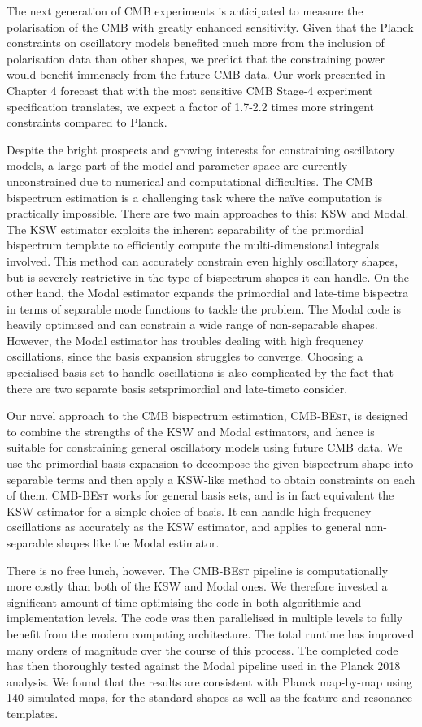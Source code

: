 The next generation of CMB experiments is anticipated to measure the polarisation of the CMB with greatly enhanced sensitivity. Given that the Planck constraints on oscillatory models benefited much more from the inclusion of polarisation data than other shapes, we predict that the constraining power would benefit immensely from the future CMB data. Our work presented in Chapter 4 forecast that with the most sensitive CMB Stage-4 experiment specification translates, we expect a factor of 1.7-2.2 times more stringent constraints compared to Planck.

Despite the bright prospects and growing interests for constraining oscillatory models, a large part of the model and parameter space are currently unconstrained due to numerical and computational difficulties. The CMB bispectrum estimation is a challenging task where the na\"ive computation is practically impossible. There are two main approaches to this: KSW and Modal. The KSW estimator exploits the inherent separability of the primordial bispectrum template to efficiently compute the multi-dimensional integrals involved. This method can accurately constrain even highly oscillatory shapes, but is severely restrictive in the type of bispectrum shapes it can handle. On the other hand, the Modal estimator expands the primordial and late-time bispectra in terms of separable mode functions to tackle the problem. The Modal code is heavily optimised and can constrain a wide range of non-separable shapes. However, the Modal estimator has troubles dealing with high frequency oscillations, since the basis expansion struggles to converge. Choosing a specialised basis set to handle oscillations is also complicated by the fact that there are two separate basis sets\textemdash primordial and late-time\textemdash to consider.

Our novel approach to the CMB bispectrum estimation, \textsc{CMB-BEst}, is designed to combine the strengths of the KSW and Modal estimators, and hence is suitable for constraining general oscillatory models using future CMB data. We use the primordial basis expansion to decompose the given bispectrum shape into separable terms and then apply a KSW-like method to obtain constraints on each of them. \textsc{CMB-BEst} works for general basis sets, and is in fact equivalent the KSW estimator for a simple choice of basis. It can handle high frequency oscillations as accurately as the KSW estimator, and applies to general non-separable shapes like the Modal estimator.

There is no free lunch, however. The \textsc{CMB-BEst} pipeline is computationally more costly than both of the KSW and Modal ones. We therefore invested a significant amount of time optimising the code in both algorithmic and implementation levels. The code was then parallelised in multiple levels to fully benefit from the modern computing architecture. The total runtime has improved many orders of magnitude over the course of this process. The completed code has then thoroughly tested against the Modal pipeline used in the Planck 2018 analysis. We found that the results are consistent with Planck map-by-map using 140 simulated maps, for the standard shapes as well as the feature and resonance templates.

